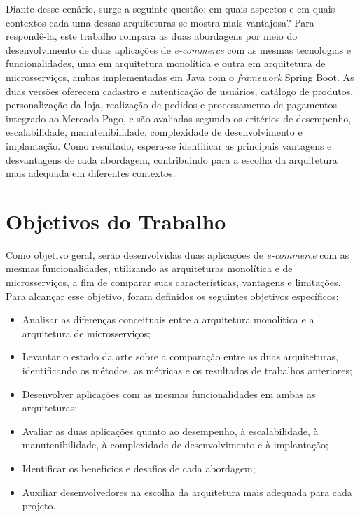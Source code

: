 Diante desse cenário, surge a seguinte questão: em quais aspectos e em quais contextos cada
uma dessas arquiteturas se mostra mais vantajosa? Para respondê-la, este trabalho compara as
duas abordagens por meio do desenvolvimento de duas aplicações de \textit{e-commerce} com as
mesmas tecnologias e funcionalidades, uma em arquitetura monolítica e outra em arquitetura de
microsserviços, ambas implementadas em Java com o \textit{framework} Spring Boot. As duas
versões oferecem cadastro e autenticação de usuários, catálogo de produtos, personalização da
loja, realização de pedidos e processamento de pagamentos integrado ao Mercado Pago, e são avaliadas segundo os critérios de
desempenho, escalabilidade, manutenibilidade, complexidade de desenvolvimento e implantação.
Como resultado, espera-se identificar as principais vantagens e desvantagens de cada
abordagem, contribuindo para a escolha da arquitetura mais adequada em diferentes contextos.

\section{Objetivos do Trabalho}

Como objetivo geral, serão desenvolvidas duas aplicações de \textit{e-commerce} com as mesmas
funcionalidades, utilizando as arquiteturas monolítica e de microsserviços, a fim de comparar
suas características, vantagens e limitações. Para alcançar esse objetivo, foram definidos os
seguintes objetivos específicos:

\begin{itemize}
    \item Analisar as diferenças conceituais entre a arquitetura monolítica e a arquitetura de
    microsserviços;
    \item Levantar o estado da arte sobre a comparação entre as duas arquiteturas, identificando
    os métodos, as métricas e os resultados de trabalhos anteriores;
    \item Desenvolver aplicações com as mesmas funcionalidades em ambas as arquiteturas;
    \item Avaliar as duas aplicações quanto ao desempenho, à escalabilidade, à
    manutenibilidade, à complexidade de desenvolvimento e à implantação;
    \item Identificar os benefícios e desafios de cada abordagem;
    \item Auxiliar desenvolvedores na escolha da arquitetura mais adequada para cada projeto.
\end{itemize}

